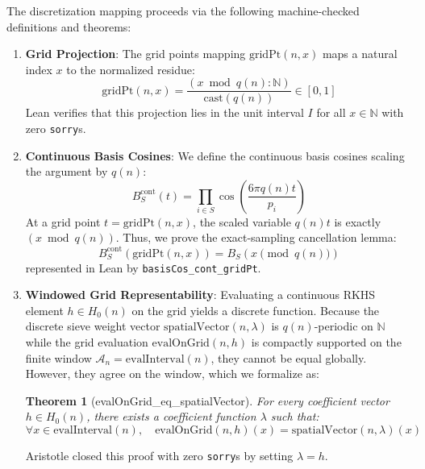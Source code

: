 \documentclass[10pt,twoside]{article}
\newtheorem{theorem}{Theorem}[section]
\begin{document}
The discretization mapping proceeds via the following machine-checked definitions and theorems:
\begin{enumerate}
    \item \textbf{Grid Projection}: The grid points mapping $\text{gridPt}(n, x)$ maps a natural index $x$ to the normalized residue:
    \begin{equation}
    \text{gridPt}(n, x) = \frac{(x \bmod q(n) : \mathbb{N})}{\text{cast}(q(n))} \in [0, 1]
    \end{equation}
    Lean verifies that this projection lies in the unit interval $I$ for all $x \in \mathbb{N}$ with zero \texttt{sorry}s.
    
    \item \textbf{Continuous Basis Cosines}: We define the continuous basis cosines scaling the argument by $q(n)$:
    \begin{equation}
    B_S^{\text{cont}}(t) = \prod_{i \in S} \cos\left( \frac{6 \pi q(n) t}{p_i} \right)
    \end{equation}
    At a grid point $t = \text{gridPt}(n, x)$, the scaled variable $q(n) t$ is exactly $(x \bmod q(n))$. Thus, we prove the exact-sampling cancellation lemma:
    \begin{equation}
    B_S^{\text{cont}}(\text{gridPt}(n, x)) = B_S(x \pmod{q(n)})
    \end{equation}
    represented in Lean by \texttt{basisCos\_cont\_gridPt}.
    
    \item \textbf{Windowed Grid Representability}: Evaluating a continuous RKHS element $h \in H_0(n)$ on the grid yields a discrete function. Because the discrete sieve weight vector $\text{spatialVector}(n, \lambda)$ is $q(n)$-periodic on $\mathbb{N}$ while the grid evaluation $\text{evalOnGrid}(n, h)$ is compactly supported on the finite window $\mathcal{A}_n = \text{evalInterval}(n)$, they cannot be equal globally. However, they agree on the window, which we formalize as:
    \begin{theorem}[evalOnGrid\_eq\_spatialVector]
    For every coefficient vector $h \in H_0(n)$, there exists a coefficient function $\lambda$ such that:
    \begin{equation}
    \forall x \in \text{evalInterval}(n), \quad \text{evalOnGrid}(n, h)(x) = \text{spatialVector}(n, \lambda)(x)
    \end{equation}
    \end{theorem}
    Aristotle closed this proof with zero \texttt{sorry}s by setting $\lambda = h$.
    

\end{enumerate}
\end{document}
